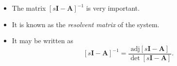 \begin{itemize}
\item The matrix $\left[s\mathbf{I}-\mathbf{A}\right]^{-1}$ is very
important. 
\item It is known as the \emph{resolvent matrix} of the system.
\item It may be written as
\begin{equation}\label{eqn:resolvent}
  \left[s\mathbf{I}-\mathbf{A}\right]^{-1} =
    \frac{\mathrm{adj}\left[s\mathbf{I}-\mathbf{A}\right]}
         {\det\left[s\mathbf{I}-\mathbf{A}\right]}.
\end{equation}
\end{itemize}

\endinput
